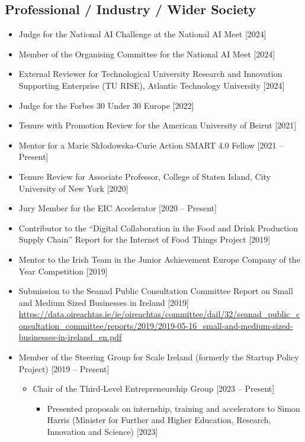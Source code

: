 \documentclass[10pt,a4paper]{res} %
\begin{document}
\begin{resume}
\subsection*{Professional / Industry / Wider Society}

\begin{itemize} \itemsep -2pt
\item Judge for the National AI Challenge at the National AI Meet [2024]
\item Member of the Organising Committee for the National AI Meet [2024]
\item External Reviewer for Technological University Research and Innovation Supporting Enterprise (TU RISE), Atlantic Technology University [2024]
\item Judge for the Forbes 30 Under 30 Europe [2022]
\item Tenure with Promotion Review for the American University of Beirut [2021]
\item Mentor for a Marie Sk\l{}odowska-Curie Action SMART 4.0 Fellow [2021 -- Present] 
\item Tenure Review for Associate Professor, College of Staten Island, City University of New York [2020]
\item Jury Member for the EIC Accelerator [2020 -- Present]
\item Contributor to the ``Digital Collaboration in the Food and Drink Production Supply Chain'' Report for the Internet of Food Things Project [2019]
\item Mentor to the Irish Team in the Junior Achievement Europe Company of the Year Competition [2019]
\item Submission to the Seanad Public Consultation Committee Report on Small and Medium Sized Businesses in Ireland [2019] \url{https://data.oireachtas.ie/ie/oireachtas/committee/dail/32/seanad_public_consultation_committee/reports/2019/2019-05-16_small-and-medium-sized-businesses-in-ireland_en.pdf}
\item Member of the Steering Group for Scale Ireland (formerly the Startup Policy Project) [2019 -- Present]
\begin{itemize} \itemsep -2pt
\item Chair of the Third-Level Entrepreneurship Group [2023 -- Present]
\begin{itemize} \itemsep -2pt
\item Presented proposals on internship, training and accelerators to Simon Harris (Minister for Further and Higher Education, Research, Innovation and Science) [2023]

\end{itemize}
\end{itemize}
\end{itemize}
\end{resume}
\end{document}
